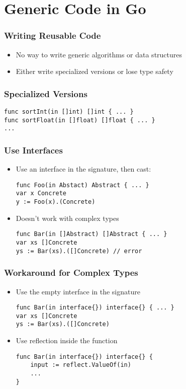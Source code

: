 \documentclass[12pt]{beamer}
\begin{document}
\section{Generic Code in Go}

\begin{frame}
\frametitle{Writing Reusable Code}
\begin{itemize}
\item No way to write generic algorithms or data structures
\item Either write specialized versions or lose type safety
\end{itemize}
\end{frame}


\begin{frame}[fragile]
\frametitle{Specialized Versions}
\begin{verbatim}
func sortInt(in []int) []int { ... }
func sortFloat(in []float) []float { ... }
...
\end{verbatim}
\end{frame}


\begin{frame}[fragile]
\frametitle{Use Interfaces}
\begin{itemize}
\item Use an interface in the signature, then cast:
\begin{verbatim}
func Foo(in Abstact) Abstract { ... }
var x Concrete
y := Foo(x).(Concrete)
\end{verbatim}
\item Doesn't work with complex types
\begin{verbatim}
func Bar(in []Abstract) []Abstract { ... }
var xs []Concrete
ys := Bar(xs).([]Concrete) // error
\end{verbatim}
\end{itemize}
\end{frame}


\begin{frame}[fragile]
\frametitle{Workaround for Complex Types}
\begin{itemize}
\item Use the empty interface in the signature
\begin{verbatim}
func Bar(in interface{}) interface{} { ... }
var xs []Concrete
ys := Bar(xs).([]Concrete)
\end{verbatim}
\item Use reflection inside the function
\begin{verbatim}
func Bar(in interface{}) interface{} {
    input := reflect.ValueOf(in)
    ...
}
\end{verbatim}
\end{itemize}
\end{frame}
\end{document}
